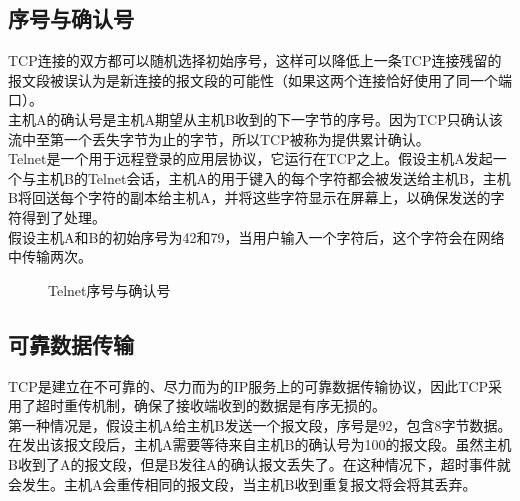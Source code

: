 \vspace{0.5cm}

\subsection{序号与确认号}

TCP连接的双方都可以随机选择初始序号，这样可以降低上一条TCP连接残留的报文段被误认为是新连接的报文段的可能性（如果这两个连接恰好使用了同一个端口）。\\

主机A的确认号是主机A期望从主机B收到的下一字节的序号。因为TCP只确认该流中至第一个丢失字节为止的字节，所以TCP被称为提供累计确认。\\

Telnet是一个用于远程登录的应用层协议，它运行在TCP之上。假设主机A发起一个与主机B的Telnet会话，主机A的用于键入的每个字符都会被发送给主机B，主机B将回送每个字符的副本给主机A，并将这些字符显示在屏幕上，以确保发送的字符得到了处理。\\

假设主机A和B的初始序号为42和79，当用户输入一个字符后，这个字符会在网络中传输两次。\\

\begin{figure}[H]
	\centering
	\caption{Telnet序号与确认号}
\end{figure}

\vspace{0.5cm}

\subsection{可靠数据传输}

TCP是建立在不可靠的、尽力而为的IP服务上的可靠数据传输协议，因此TCP采用了超时重传机制，确保了接收端收到的数据是有序无损的。\\

第一种情况是，假设主机A给主机B发送一个报文段，序号是92，包含8字节数据。在发出该报文段后，主机A需要等待来自主机B的确认号为100的报文段。虽然主机B收到了A的报文段，但是B发往A的确认报文丢失了。在这种情况下，超时事件就会发生。主机A会重传相同的报文段，当主机B收到重复报文将会将其丢弃。\\


